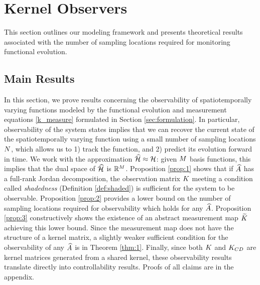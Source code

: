 \vspace{-0.1in}
\section{Kernel Observers}\label{sec:observers}
This section outlines our modeling framework and presents theoretical results associated with the number of sampling locations required for monitoring functional evolution. 

\vspace{-0.1in}
\subsection{Main Results}\label{sec:theory_results}
In this section, we prove results concerning the observability of spatiotemporally varying functions modeled by the functional evolution and measurement equations \eqref{k_measure} formulated in Section \ref{sec:formulation}. In particular,  observability of the system states implies that we can recover the current state of the spatiotemporally varying function using a small number of sampling locations $N$, which allows us to 1) track the function, and 2) predict its evolution forward in time. We work with the approximation $\widehat{\mathcal{H}}\approx\mathcal{H}$: given $M$ basis functions, this implies that the dual space of $\widehat{\mathcal{H}}$ is $\mathbb{R}^{M}$.
Proposition \ref{prop:1} shows that if $\widehat{A}$ has a full-rank Jordan decomposition, the observation matrix $K$ meeting a condition called \emph{shadedness} (Definition \ref{def:shaded}) is sufficient for the system to be observable. Proposition \ref{prop:2} provides a lower bound on the number of sampling locations required for observability which holds for any $\widehat{A}$.  Proposition \ref{prop:3} constructively shows the existence of an abstract measurement map $\widetilde{K}$ achieving this lower bound. Since the measurement map does not have the structure of a kernel matrix, a slightly weaker sufficient condition for the observability of any $\widehat{A}$ is in Theorem \ref{thm:1}. Finally, since both $K$ and $K_{CD}$ are kernel matrices generated from a shared kernel, these observability results translate directly into controllability results. Proofs of all claims are in the appendix. 

